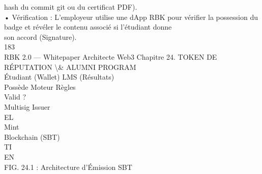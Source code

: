 hash du commit git ou du certificat PDF).\\
\vspace{0.5em}
• Vérification : L’employeur utilise une dApp RBK pour vérifier la possession du badge et révéler le contenu associé si l’étudiant donne\\
son accord (Signature).\\
\vspace{0.5em}
\vspace{0.5em}
\vspace{0.5em}
\vspace{0.5em}
183\\
RBK 2.0 — Whitepaper Architecte Web3                                                   Chapitre 24. TOKEN DE RÉPUTATION \textbackslash{}& ALUMNI PROGRAM\\
\vspace{0.5em}
\vspace{0.5em}
\vspace{0.5em}
Étudiant (Wallet)                 LMS (Résultats)\\
\vspace{0.5em}
\vspace{0.5em}
\vspace{0.5em}
\vspace{0.5em}
Possède                            Moteur Règles\\
\vspace{0.5em}
\vspace{0.5em}
Valid ?\\
\vspace{0.5em}
\vspace{0.5em}
Multisig Issuer\\
\vspace{0.5em}
\vspace{0.5em}
\vspace{0.5em}
\vspace{0.5em}
EL\\
Mint\\
Blockchain (SBT)\\
\vspace{0.5em}
\vspace{0.5em}
\vspace{0.5em}
\vspace{0.5em}
TI\\
EN\\
FIG. 24.1 : Architecture d’Émission SBT\\
\vspace{0.5em}
\vspace{0.5em}
